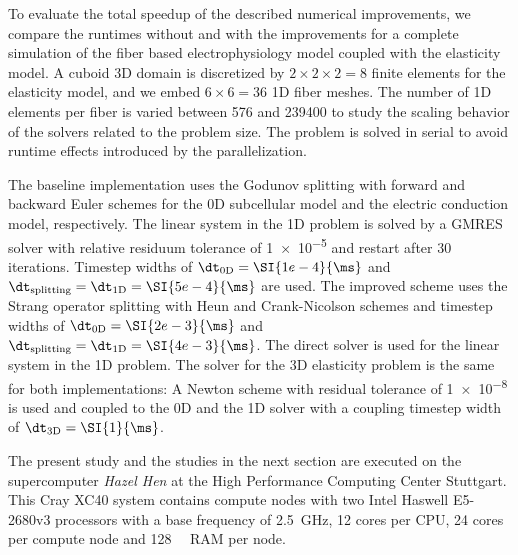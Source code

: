 To evaluate the total speedup of the described numerical improvements, we compare the runtimes without and with the improvements for a complete simulation of the fiber based electrophysiology model coupled with the elasticity model. A cuboid 3D domain is discretized by $2\times 2\times 2=8$ finite elements for the elasticity model, and we embed $6\times 6=36$ 1D fiber meshes. The number of 1D elements per fiber is varied between 576 and \num{239400} to study the scaling behavior of the solvers related to the problem size. The problem is solved in serial to avoid runtime effects introduced by the parallelization.

The baseline implementation uses the Godunov splitting with forward and backward Euler schemes for the 0D subcellular model and the electric conduction model, respectively. The linear system in the 1D problem is solved by a GMRES solver with relative residuum tolerance of \num{1e-5} and restart after 30 iterations. Timestep widths of $\dt_\text{0D}=\SI{1e-4}{\ms}$ and $\dt_\text{splitting}=\dt_\text{1D}=\SI{5e-4}{\ms}$ are used. The improved scheme uses the Strang operator splitting with Heun and Crank-Nicolson schemes and timestep widths of $\dt_\text{0D}=\SI{2e-3}{\ms}$ and $\dt_\text{splitting}=\dt_\text{1D} = \SI{4e-3}{\ms}$. The direct solver is used for the linear system in the 1D problem.
The solver for the 3D elasticity problem is the same for both implementations: A Newton scheme with residual tolerance of \num{1e-8} is used
 and coupled to the 0D and the 1D solver with a coupling timestep width of $\dt_\text{3D}=\SI{1}{\ms}$.

The present study and the studies in the next section are executed on the supercomputer \emph{Hazel Hen} at the High Performance Computing Center Stuttgart. This Cray XC40 system contains compute nodes with two Intel Haswell E5-2680v3 processors with a base frequency of \SI{2.5}{\giga\hertz}, 12 cores per CPU, 24 cores per compute node and \SI{128}{\giga\byte} RAM per node.


